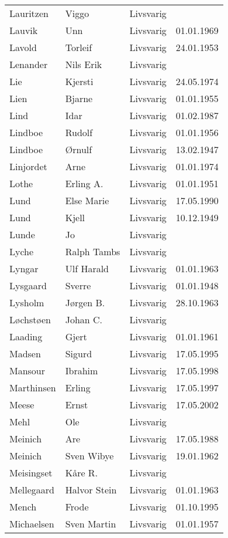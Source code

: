 \begin{longtable}{llll}
Lauritzen	&	Viggo	&	Livsvarig 	&		\\
Lauvik	&	Unn	&	Livsvarig 	&	01.01.1969	\\
Lavold	&	Torleif	&	Livsvarig 	&	24.01.1953	\\
Lenander	&	Nils Erik	&	Livsvarig 	&		\\
Lie	&	Kjersti	&	Livsvarig 	&	24.05.1974	\\
Lien	&	Bjarne	&	Livsvarig 	&	01.01.1955	\\
Lind	&	Idar	&	Livsvarig 	&	01.02.1987	\\
Lindboe	&	Rudolf	&	Livsvarig 	&	01.01.1956	\\
Lindboe	&	Ørnulf	&	Livsvarig 	&	13.02.1947	\\
Linjordet	&	Arne	&	Livsvarig 	&	01.01.1974	\\
Lothe	&	Erling A.	&	Livsvarig 	&	01.01.1951	\\
Lund	&	Else Marie	&	Livsvarig 	&	17.05.1990	\\
Lund	&	Kjell	&	Livsvarig 	&	10.12.1949	\\
Lunde	&	Jo	&	Livsvarig 	&		\\
Lyche	&	Ralph Tambs	&	Livsvarig 	&		\\
Lyngar	&	Ulf Harald	&	Livsvarig 	&	01.01.1963	\\
Lysgaard	&	Sverre	&	Livsvarig 	&	01.01.1948	\\
Lysholm	&	Jørgen B.	&	Livsvarig 	&	28.10.1963	\\
Løchstøen	&	Johan C.	&	Livsvarig 	&		\\
Laading	&	Gjert	&	Livsvarig 	&	01.01.1961	\\
Madsen 	&	Sigurd 	&	Livsvarig 	&	17.05.1995	\\
Mansour 	&	Ibrahim	&	Livsvarig	&	17.05.1998	\\
Marthinsen 	&	Erling	&	Livsvarig	&	17.05.1997	\\
Meese 	&	Ernst	&	Livsvarig	&	17.05.2002	\\
Mehl	&	Ole	&	Livsvarig 	&		\\
Meinich	&	Are	&	Livsvarig 	&	17.05.1988	\\
Meinich	&	Sven Wibye	&	Livsvarig 	&	19.01.1962	\\
Meisingset	&	Kåre R.	&	Livsvarig 	&		\\
Mellegaard	&	Halvor Stein	&	Livsvarig 	&	01.01.1963	\\
Mench 	&	Frode	&	Livsvarig	&	01.10.1995	\\
Michaelsen	&	Sven Martin	&	Livsvarig 	&	01.01.1957	\\

\end{longtable}
